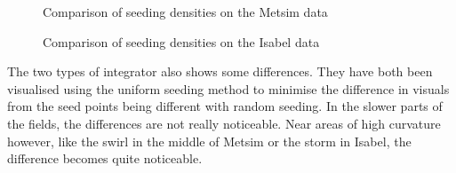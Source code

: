 \documentclass{article}
\begin{document}
\begin{figure}
\caption{Comparison of seeding densities on the Metsim data}
\end{figure}

\begin{figure}
\caption{Comparison of seeding densities on the Isabel data}
\end{figure}

The two types of integrator also shows some differences. They have both been visualised
using the uniform seeding method to minimise the difference in visuals from the seed
points being different with random seeding. In the slower parts of the fields, the
differences are not really noticeable. Near areas of high curvature however, like
the swirl in the middle of Metsim or the storm in Isabel, the difference becomes
quite noticeable.
\end{document}
